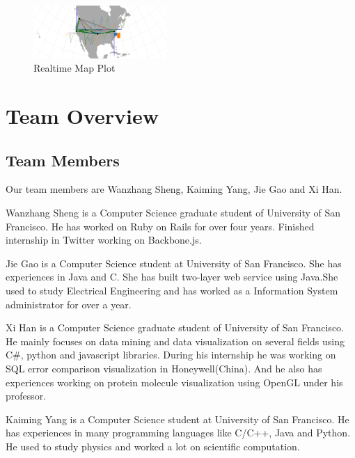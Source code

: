 \documentclass[paper=a4, fontsize=11pt]{report} %
\begin{document}
\begin{description}[style=nextline]
	\begin{figure}[H]
        \begin{center}
            \includegraphics[width=0.45\textwidth]{realtime.png}
        \end{center}
        \caption{Realtime Map Plot}\label{fig:mapplot1}
    \end{figure}

\end{description}




\section{Team Overview} %
\label{sec:team_ovierview}
\subsection{Team Members} %
\label{sub:team_members}
Our team members are Wanzhang Sheng, Kaiming Yang, Jie Gao and Xi Han.

Wanzhang Sheng is a Computer Science graduate student of University of San Francisco. He has worked on Ruby on Rails for over four years. Finished internship in Twitter working on Backbone.js.

Jie Gao is a Computer Science student at University of San Francisco. She has experiences in Java and C. She has built two-layer web service using Java.She used to study Electrical Engineering and has worked as a Information System administrator for over a year.

Xi Han is a Computer Science graduate student of University of San Francisco. He mainly focuses on data mining and data visualization on several fields using C\#, python and javascript libraries. During his internship he was working on SQL error comparison visualization in Honeywell(China). And he also has experiences working on protein molecule visualization using OpenGL under his professor. 

Kaiming Yang is a Computer Science student at University of San Francisco. He has experiences in many programming languages like C/C++, Java and Python. He used to study physics and worked a lot on scientific computation.
\end{document}
